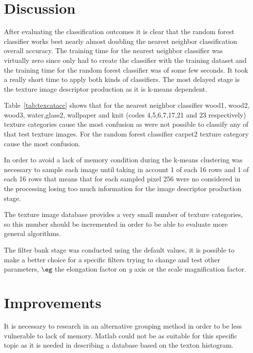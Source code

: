 \documentclass[10pt,twocolumn,letterpaper]{article}
\begin{document}
\section{Discussion}
After evaluating the classification outcomes it is clear that the random forest classifier works best nearly almost doubling the nearest neighbor classification overall accuracy. The training time for the nearest neighbor classifier was virtually zero since only had to create the classifier with the training dataset and the training time for the random forest classifier was of some few seconds. It took a really short time to apply both kinds of classifiers. The most delayed stage is the texture image descriptor production as it is k-means dependent.

Table~\ref{tab:texcatacc} shows that for the nearest neighbor classifier wood1, wood2, wood3, water,glass2, wallpaper and knit (codes 4,5,6,7,17,21 and 23 respectively) texture categories cause the most confusion as were not possible to classify any of that test texture images. For the random forest classifier carpet2 texture category cause the  most confusion.

In order to avoid a lack of memory condition during the k-means clustering was necessary to sample each image until taking in account 1 of each 16 rows and 1 of each 16 rows that means that for each sampled pixel 256 were no considered in the processing losing too much information for the image descriptor production stage.

The texture image database provides a very small number of texture categories, so this number should be incremented in order to be able to evaluate more general algorithms.

The filter bank stage was conducted using the default values, it is possible to make a better choice for a specific filters trying to change and test other parameters, $\eg$ the elongation factor on \textit{y} axis or the scale magnification factor.

\section{Improvements}
It is necessary to research in an alternative grouping method in order to be less vulnerable to lack of memory. Matlab could not be as suitable for this specific topic as it is needed in describing a database based on the texton histogram.




%
%
\end{document}

